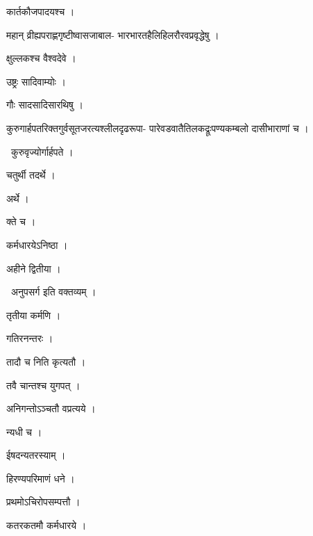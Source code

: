 \documentclass[10pt, openany, oneside]{book}
\begin{document}
\noindent कार्तकौजपादयश्च ।

\noindent महान् व्रीह्यपराह्णगृष्टीष्वासजाबाल- भारभारतहैलिहिलरौरवप्रवृद्धेषु ।

\noindent क्षुल्लकश्च वैश्वदेवे ।

\noindent उष्ट्रः सादिवाम्योः ।

\noindent गौः सादसादिसारथिषु ।

\noindent कुरुगार्हपतरिक्तगुर्वसूतजरत्यश्लीलदृढरूपा- पारेवडवातैतिलकद्रूःपण्यकम्बलो दासीभाराणां च ।

\par\noindent\hspace{1.5em}{\vps वा॰}~{\qt कुरुवृज्योर्गार्हपते ।}

\noindent चतुर्थी तदर्थे ।

\noindent अर्थे ।

\noindent क्ते च ।

\noindent कर्मधारयेऽनिष्ठा ।

\noindent अहीने द्वितीया ।

\par\noindent\hspace{1.5em}{\vps वा॰}~{\qt अनुपसर्ग इति वक्तव्यम् ।}

\noindent तृतीया कर्मणि ।

\noindent गतिरनन्तरः ।

\noindent तादौ च निति कृत्यतौ ।

\noindent तवै चान्तश्च युगपत् ।

\noindent अनिगन्तोऽञ्चतौ वप्रत्यये ।

\noindent न्यधी च ।

\noindent ईषदन्यतरस्याम् ।

\noindent हिरण्यपरिमाणं धने ।

\noindent प्रथमोऽचिरोपसम्पत्तौ ।

\noindent कतरकतमौ कर्मधारये ।
\end{document}
